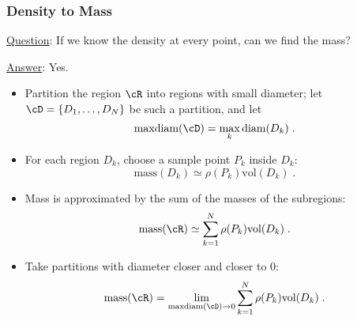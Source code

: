 \begin{frame}
  \frametitle{Density to Mass}
  \underline{Question}: If we know the density at every point, can we find the mass?

  \underline{Answer}: Yes.

\begin{itemize}
  \item Partition the region $\cR$ into regions with small diameter; let $\cD=\{D_1,\ldots,D_N\}$ be such a partition, and let
      $$\text{maxdiam}(\cD) = \max_{k} \text{diam}(D_k)\; .$$
  \item For each region $D_k$, choose a sample point $P_k$ inside $D_k$:
      $$\text{mass}(D_k) \simeq \rho(P_k) \text{vol}(D_k)\; .$$
      \item Mass is approximated by the sum of the masses of the subregions:
      $$\text{mass}(\cR) \simeq \sum_{k=1}^{N} \rho(P_k)\text{vol}(D_k)\; .$$
      \item Take partitions with diameter closer and closer to 0:
      $$\text{mass}(\cR) = \lim_{\text{maxdiam}(\cD) \to 0}  \sum_{k=1}^{N} \rho(P_k)\text{vol}(D_k)\; .$$
\end{itemize}
\end{frame}